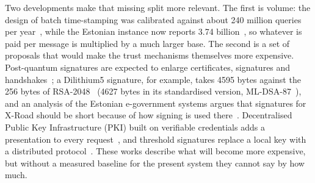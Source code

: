\documentclass[conference,a4paper]{IEEEtran}
\newcommand{\newtext}[1]{{\color{blue}#1}}
\begin{document}
Two developments make that missing split more relevant. The first is volume: the design of batch
time-stamping was calibrated against about 240 million queries per year~\cite{ansper2013}, while the
Estonian instance now reports 3.74 billion~\cite{xteefactsheet}, so whatever is paid per message is
multiplied by a much larger base. The second is a set of proposals that would make the trust
mechanisms themselves more expensive. Post-quantum signatures are expected to enlarge certificates,
signatures and handshakes~\cite{bakhtina2026pqc,snetkov2023}; a Dilithium5 signature, for example,
takes 4595 bytes against the 256 bytes of RSA-2048~\cite{snetkov2023} \newtext{(4627 bytes in its standardised version, ML-DSA-87~\cite{fips204})}, \newtext{and an analysis of the
Estonian e-government systems argues that signatures for X-Road should be short because of how
signing is used there~\cite{vakarjuk2024}}. Decentralised Public Key
Infrastructure (PKI) built on verifiable credentials adds a presentation to every
request~\cite{bakhtina2023ares}, and threshold signatures replace a local key with a distributed
protocol~\cite{bakhtina2026ijis}. These works describe what will become more expensive, but without a
measured baseline for the present system they cannot say by how much.
\end{document}
